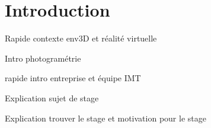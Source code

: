 \chapter{Introduction}

\par
Rapide contexte env3D et réalité virtuelle

\par
Intro photogramétrie


\par
rapide intro entreprise et équipe IMT

\par
Explication sujet de stage

\par
Explication trouver le stage et motivation pour le stage

